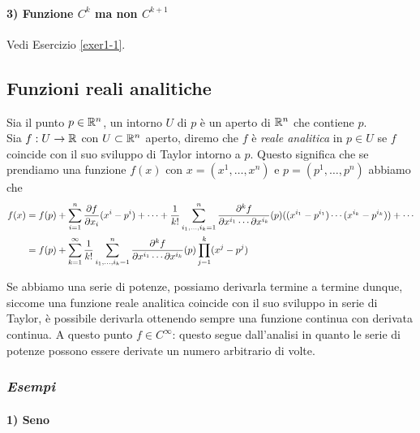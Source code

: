\paragraph{3) Funzione $ C^{k} $ ma non $ C^{k+1} $}

Vedi Esercizio \ref{exer1-1}.

\subsection{Funzioni reali analitiche}

Sia il punto $ p \in \mathbb{R}^{n} $, un intorno $ U $ di $ p $ è un aperto di $ \mathbb{R}^{n} $ che contiene $ p $. \\
Sia $ f : U \to \mathbb{R} $ con $ U \subset \mathbb{R}^{n} $ aperto, diremo che $ f $ è \textit{reale analitica} in $ p \in U $ se $ f $ coincide con il suo sviluppo di Taylor intorno a $ p $. Questo significa che se prendiamo una funzione $ f (x) $ con $ x = (x^{1}, \dots, x^{n}) $ e $ p = (p^{1}, \dots, p^{n}) $ abbiamo che
\begin{align}
	\begin{split}
		f (x) &= f (p) + \sum_{i=1}^{n} \pdv{f}{x_{i}} (p) (x^{i} - p^{i}) + \cdots + \dfrac{1}{k!} \sum_{i_{1},\dots,i_{k}=1}^{n} \dfrac{\partial^{k} f}{\partial x^{i_{1}} \cdots \partial x^{i_{k}}} (p) ( (x^{i_{1}} - p^{i_{1}}) \cdots (x^{i_{k}} - p^{i_{k}}) ) + \cdots \\
		&= f (p) + \sum_{k=1}^{\infty} \dfrac{1}{k!} \sum_{i_{1},\dots,i_{k}=1}^{n} \dfrac{\partial^{k} f}{\partial x^{i_{1}} \cdots \partial x^{i_{k}}} (p) \prod_{j=1}^{k} (x^{j} - p^{j})
	\end{split}
\end{align}

Se abbiamo una serie di potenze, possiamo derivarla termine a termine dunque, siccome una funzione reale analitica coincide con il suo sviluppo in serie di Taylor, è possibile derivarla ottenendo sempre una funzione continua con derivata continua. A questo punto $ f \in C^{\infty} $: questo segue dall'analisi in quanto le serie di potenze possono essere derivate un numero arbitrario di volte.

\subsubsection{\textit{Esempi}}

\paragraph{1) Seno}

